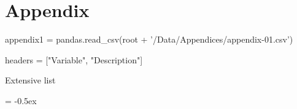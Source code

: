 
\chapter{Appendix} %

\label{AppendixA} %

\begin{pycode} 
	appendix1 = pandas.read_csv(root + '/Data/Appendices/appendix-01.csv')
	
	headers = ["Variable", "Description"]
\end{pycode}

\begin{table}[H]	
\begin{center}
\caption{Extensive list}
\small{
}
\end{center}
\end{table}



\extrarowheight = -0.5ex
\renewcommand{\arraystretch}{1.25}

